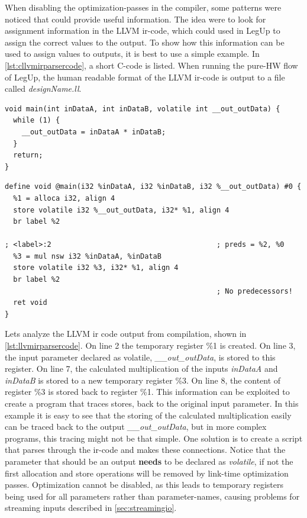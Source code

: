 When disabling the optimization-passes in the compiler, some patterns were noticed that could provide useful information. The idea were to look for assignment information in the LLVM \gls{ir}-code, which could used in LegUp to assign the correct values to the output. To show how this information can be used to assign values to outputs, it is best to use a simple example. In \cref{lst:cllvmirparsercode}, a short C-code is listed. When running the pure-HW flow of LegUp, the human readable format of the LLVM \gls{ir}-code is output to a file called \textit{designName.ll}.
\lstset{language=C,style=Cstyle}
\begin{lstlisting}[caption={Simple C-code example for LLVM IR parsing},label=lst:cllvmirparsercode]
void main(int inDataA, int inDataB, volatile int __out_outData) {
  while (1) {
    __out_outData = inDataA * inDataB;
  }
  return;
}
\end{lstlisting}
\lstset{language=LLVM,style=LLVMStyle}
\begin{lstlisting}[caption={LLVM IR code for simple parsing example},label=lst:llvmirparsercode]
define void @main(i32 %inDataA, i32 %inDataB, i32 %__out_outData) #0 {
  %1 = alloca i32, align 4
  store volatile i32 %__out_outData, i32* %1, align 4
  br label %2

; <label>:2                                       ; preds = %2, %0
  %3 = mul nsw i32 %inDataA, %inDataB
  store volatile i32 %3, i32* %1, align 4
  br label %2
                                                  ; No predecessors!
  ret void
}
\end{lstlisting}
Lets analyze the LLVM \gls{ir} code output from compilation, shown in \cref{lst:llvmirparsercode}. On line 2 the temporary register \%1 is created. On line 3, the input parameter declared as volatile, \textit{\_\_out\_outData}, is stored to this register. On line 7, the calculated multiplication of the inputs \textit{inDataA} and \textit{inDataB} is stored to a new temporary register \%3. On line 8, the content of register \%3 is stored back to register \%1. This information can be exploited to create a program that traces stores, back to the original input parameter. In this example it is easy to see that the storing of the calculated multiplication easily can be traced back to the output \textit{\_\_out\_outData}, but in more complex programs, this tracing might not be that simple. One solution is to create a script that parses through the \gls{ir}-code and makes these connections. Notice that the parameter that should be an output \textbf{needs} to be declared as \textit{volatile}, if not the first allocation and store operations will be removed by link-time optimization passes. Optimization cannot be disabled, as this leads to temporary registers being used for all parameters rather than parameter-names, causing problems for streaming inputs described in \cref{sec:streamingio}.


